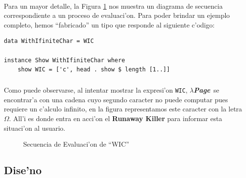 \documentclass[a4paper]{article}
\newcommand{\hpage}{\textbf{\textsl{$\lambda$Page}}}
\begin{document}
\paragraph{}Para un mayor detalle, la Figura \ref{seq1} nos muestra un diagrama de secuencia correspondiente a un proceso de evaluaci'on.  Para poder brindar un ejemplo completo, hemos ``fabricado'' un tipo que responde al siguiente c'odigo:
\lstset{language=haskell, frame=single, tabsize=4}
\begin{center}\begin{lstlisting}
data WithIfiniteChar = WIC

instance Show WithIfiniteChar where
    show WIC = ['c', head . show $ length [1..]]
\end{lstlisting}\end{center}
\subparagraph{}Como puede observarse, al intentar mostrar la expresi'on \texttt{WIC}, \hpage\ se encontrar'a con una cadena cuyo segundo caracter no puede computar pues requiere un c'alculo infinito, en la figura representamos este caracter con la letra $\Omega$.  All'i es donde entra en acci'on el \textbf{Runaway Killer} para informar esta situaci'on al usuario.
\begin{figure}[hp]
	\begin{center}
		\caption{Secuencia de Evaluaci'on de ``WIC''}
		\label{seq1}
	\end{center}
\end{figure}

\newpage
\subsection{Dise'no}
\begin{epigraphs}
\end{epigraphs}
\end{document}
